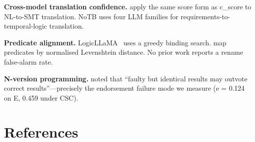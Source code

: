 \documentclass[11pt,letterpaper]{article}
\begin{document}
\textbf{Cross-model translation confidence.} \citet{Bayless2025} apply the same score form as c\_score to NL-to-SMT translation. NoTB uses four LLM families for requirements-to-temporal-logic translation.

\textbf{Predicate alignment.} LogicLLaMA~\citep{Yang2023logicllama} uses a greedy binding search. \citet{Vossel2025} map predicates by normalised Levenshtein distance. No prior work reports a rename false-alarm rate.

\textbf{N-version programming.} \citet{Chen1978} noted that ``faulty but identical results may outvote correct results''---precisely the endorsement failure mode we measure (e = 0.124 on E, 0.459 under CSC).

\section*{References}
\end{document}
